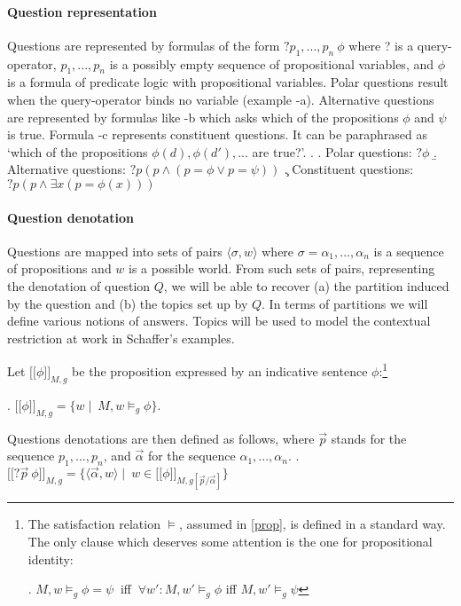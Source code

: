 \documentclass[a4paper, 11pt]{article}
\newcommand{\lin}{\ensuremath{\lbrack\!\lbrack}}
\newcommand{\rin}{\ensuremath{\rbrack\!\rbrack}}
\begin{document}
\paragraph{Question representation} 

Questions are represented  by   formulas of the form $?  p_1, ..., p_n \ \phi$ where ? is a query-operator, $p_1, ..., p_n$ is a possibly empty sequence of propositional variables, and $\phi$ is a formula of   predicate logic with   propositional variables.   Polar questions result when the query-operator binds no variable  (example \Next-a). Alternative questions are represented by   formulas like \Next-b which asks which of the propositions $\phi$ and $\psi$ is true. Formula \Next-c represents constituent questions.  It can be paraphrased as `which of the propositions   $ \phi(d),   \phi(d'),... $ are true?'.
\ex.
\a. Polar questions: $?  \phi$
\b. Alternative questions: $?p ( p \wedge   (p=\phi \vee p=\psi)    )$
\c. Constituent questions: $?p (p \wedge  \exists x (p=\phi(x)) )$


\paragraph{Question denotation}
Questions are mapped into sets of   pairs   $\langle \sigma,w\rangle$ where $\sigma=\alpha_1,...,\alpha_n$ is a   sequence of propositions and $w$ is a possible world. From such sets of pairs, representing the denotation of question $Q$, we will be able to recover (a) the partition induced by the question  and (b) the topics  set up by $Q$. In terms of partitions we will define various notions of answers. Topics will be used to model the contextual restriction  at work in Schaffer's examples.


Let $\lin \phi\rin_{M,g}$ be the  proposition expressed by an indicative sentence $\phi$:\footnote{The satisfaction relation $\models$, assumed in \ref{prop},  is defined in a standard way. The only clause which deserves some attention is the one for propositional identity:
 
 \ex. $M,w   \models_g  \phi=\psi \ $ iff $ \ \forall w': M,w'   \models_g  \phi $ iff $M,w'   \models_g \psi$ 

}

\ex. \label{prop} $\lin  \phi\rin_{M,g} = \{   w  \mid  \ M,w   \models_{g} \phi \}$. 
 
Questions denotations are then defined as follows, where
 $\vec{p}$ stands for the sequence $p_1,...,p_n$, and  $\vec{\alpha}$ for  the sequence $\alpha_1,...,\alpha_n$.  
\ex. \label{qden} $\lin? \vec{p} \ \phi\rin_{M,g} = \{ \langle \vec{\alpha}, w\rangle \mid  \ w \in  \lin  \phi\rin_{M,g[\vec{p} / \vec{\alpha}  ]}  \}$ 
 
\end{document}
